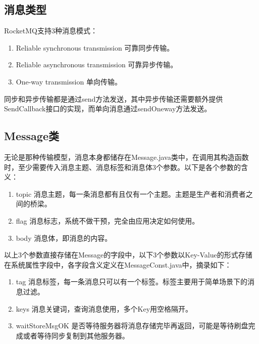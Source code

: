 \subsection{消息类型}\label{subsection:message-type}
RocketMQ支持3种消息模式：

\begin{enumerate}[itemindent=1em]

\item Reliable synchronous transmission 可靠同步传输。

\item Reliable asynchronous transmission 可靠异步传输。

\item One-way transmission 单向传输。

\end{enumerate} 

同步和异步传输都是通过send方法发送，其中异步传输还需要额外提供SendCallback接口的实现，而单向消息通过sendOneway方法发送。

\subsection{Message类}
无论是那种传输模型，消息本身都储存在Message.java类中，在调用其构造函数时，至少需要传入消息主题、消息标签和消息体3个参数。以下是各个参数的含义：

\begin{enumerate}[itemindent=1em]

\item topic 消息主题，每一条消息都有且仅有一个主题。主题是生产者和消费者之间的桥梁。

\item flag 消息标志，系统不做干预，完全由应用决定如何使用。

\item body 消息体，即消息的内容。

\end{enumerate} 


以上3个参数直接存储在Message的字段中，以下3个参数以Key-Value的形式存储在系统属性字段中，各字段含义定义在MessageConst.java中，摘录如下：
\begin{enumerate}[itemindent=1em]

\item tag 消息标签，每一条消息只可以有一个标签。标签主要用于简单场景下的消息过滤\cite{filter-example}。

\item keys 消息关键词，查询消息使用，多个Key用空格隔开。

\item waitStoreMsgOK 是否等待服务器将消息存储完毕再返回，可能是等待刷盘完成或者等待同步复制到其他服务器。

\end{enumerate} 


